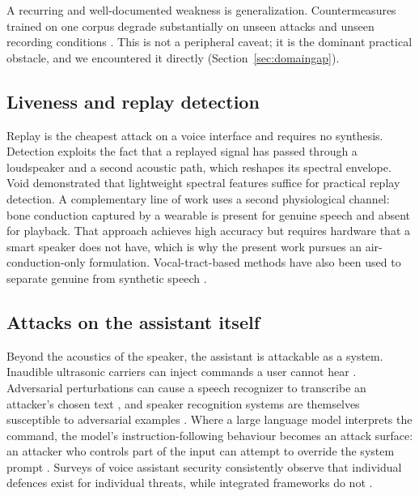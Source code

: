 \documentclass[conference]{IEEEtran}
\begin{document}
A recurring and well-documented weakness is generalization. Countermeasures
trained on one corpus degrade substantially on unseen attacks and unseen
recording conditions \cite{muller2022generalize}. This is not a peripheral
caveat; it is the dominant practical obstacle, and we encountered it directly
(Section~\ref{sec:domaingap}).

\subsection{Liveness and replay detection}
Replay is the cheapest attack on a voice interface and requires no synthesis.
Detection exploits the fact that a replayed signal has passed through a
loudspeaker and a second acoustic path, which reshapes its spectral envelope.
Void \cite{ahmed2020void} demonstrated that lightweight spectral features
suffice for practical replay detection. A complementary line of work uses a
second physiological channel: bone conduction captured by a wearable is
present for genuine speech and absent for playback. That approach achieves high
accuracy but requires hardware that a smart speaker does not have, which is why
the present work pursues an air-conduction-only formulation. Vocal-tract-based
methods have also been used to separate genuine from synthetic speech
\cite{blue2022vocaltract}.

\subsection{Attacks on the assistant itself}
Beyond the acoustics of the speaker, the assistant is attackable as a system.
Inaudible ultrasonic carriers can inject commands a user cannot hear
\cite{zhang2017dolphin}. Adversarial perturbations can cause a speech
recognizer to transcribe an attacker's chosen text \cite{carlini2018audio}, and
speaker recognition systems are themselves susceptible to adversarial examples
\cite{chen2021bob}. Where a large language model interprets the command, the
model's instruction-following behaviour becomes an attack surface: an attacker
who controls part of the input can attempt to override the system prompt
\cite{greshake2023injection}. Surveys of voice assistant security consistently
observe that individual defences exist for individual threats, while integrated
frameworks do not \cite{cheng2022survey}.
\end{document}
